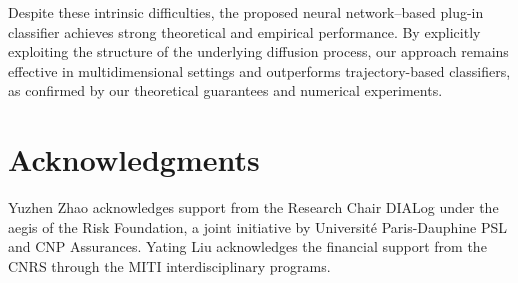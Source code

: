 \documentclass{article}
\theoremstyle{plain}
\theoremstyle{definition}
\theoremstyle{remark}
\begin{document}

Despite these intrinsic difficulties, the proposed neural network--based plug-in classifier achieves strong theoretical and empirical performance. By explicitly exploiting the structure of the underlying diffusion process, our approach remains effective in multidimensional settings and outperforms trajectory-based classifiers,  as confirmed by our theoretical guarantees and numerical experiments.





\section*{Acknowledgments}
Yuzhen Zhao acknowledges support from the Research Chair DIALog under the aegis of the Risk Foundation, a joint initiative by Université Paris-Dauphine PSL and CNP Assurances. Yating Liu acknowledges the financial support from the CNRS through the MITI interdisciplinary programs.
\end{document}
